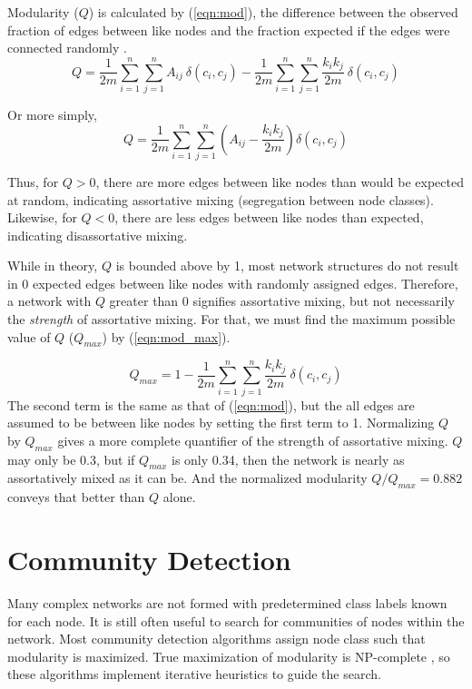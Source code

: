 \documentclass{IEEEtran}
\begin{document}
	Modularity ($Q$) is calculated by (\ref{eqn:mod}), the difference between the observed fraction of edges between like nodes and the fraction expected if the edges were connected randomly \cite{Mod}.
	\begin{equation}
	\label{eqn:mod}
	Q = \frac{1}{2m}\sum_{i=1}^{n}\sum_{j=1}^{n}A_{ij}~\delta(c_i,c_j) - \frac{1}{2m}\sum_{i=1}^{n}\sum_{j=1}^{n}\frac{k_ik_j}{2m}~\delta(c_i,c_j)
	\end{equation}
	
	\noindent
	Or more simply,
	\begin{equation}
		\label{eqn:mod2}
		Q = \frac{1}{2m}\sum_{i=1}^{n}\sum_{j=1}^{n}\left(A_{ij} -\frac{k_ik_j}{2m}\right)\delta(c_i,c_j)
	\end{equation}
	
	Thus, for $Q>0$, there are more edges between like nodes than would be expected at random, indicating assortative mixing (segregation between node classes). Likewise, for $Q<0$, there are less edges between like nodes than expected, indicating disassortative mixing.
	
	While in theory, $Q$ is bounded above by 1, most network structures do not result in 0 expected edges between like nodes with randomly assigned edges. Therefore, a network with $Q$ greater than 0 signifies assortative mixing, but not necessarily the \textit{strength} of assortative mixing. For that, we must find the maximum possible value of $Q$ ($Q_{max}$) by (\ref{eqn:mod_max}).
	
	\begin{equation}
	\label{eqn:mod_max}
	Q_{max} = 1 - \frac{1}{2m}\sum_{i=1}^{n}\sum_{j=1}^{n}\frac{k_ik_j}{2m}~\delta(c_i,c_j)
	\end{equation}
	The second term is the same as that of (\ref{eqn:mod}), but the all edges are assumed to be between like nodes by setting the first term to 1. Normalizing $Q$ by $Q_{max}$ gives a more complete quantifier of the strength of assortative mixing. $Q$ may only be 0.3, but if $Q_{max}$ is only 0.34, then the network is nearly as assortatively mixed as it can be. And the normalized modularity $Q/Q_{max}=0.882$ conveys that better than $Q$ alone. 
	
	\section{Community Detection}
	\label{s:com}
	Many complex networks are not formed with predetermined class labels known for each node. It is still often useful to search for communities of nodes within the network. Most community detection algorithms assign node class such that modularity is maximized. True maximization of modularity is NP-complete \cite{NP}, so these algorithms implement iterative heuristics to guide the search.
	
\end{document}
